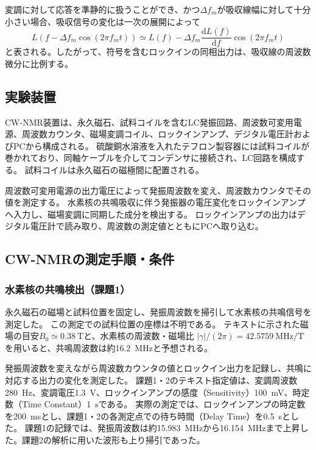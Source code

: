 \documentclass[dvipdfmx,a4paper,11pt]{jsarticle}
\begin{document}
変調に対して応答を準静的に扱うことができ、かつ$\Delta f_m$が吸収線幅に対して十分小さい場合、吸収信号の変化は一次の展開によって
\begin{equation}
 L\!\left(f-\Delta f_m\cos(2\pi f_m t)\right)
 \simeq L(f)-\Delta f_m\frac{\mathrm{d}L(f)}{\mathrm{d}f}\cos(2\pi f_m t)
\end{equation}
と表される。したがって、符号を含むロックインの同相出力は、吸収線の周波数微分に比例する。

\subsection{実験装置}
CW-NMR装置は、永久磁石、試料コイルを含むLC発振回路、周波数可変用電源、周波数カウンタ、磁場変調コイル、ロックインアンプ、デジタル電圧計およびPCから構成される\cite{manual}。
硫酸銅水溶液を入れたテフロン製容器には試料コイルが巻かれており、同軸ケーブルを介してコンデンサに接続され、LC回路を構成する。
試料コイルは永久磁石の磁極間に配置される。

周波数可変用電源の出力電圧によって発振周波数を変え、周波数カウンタでその値を測定する。
水素核の共鳴吸収に伴う発振器の電圧変化をロックインアンプへ入力し、磁場変調に同期した成分を検出する。
ロックインアンプの出力はデジタル電圧計で読み取り、周波数の測定値とともにPCへ取り込む。

\subsection{CW-NMRの測定手順・条件}
\label{sec:method-cw}
\subsubsection{水素核の共鳴検出（課題1）}
永久磁石の磁場と試料位置を固定し、発振周波数を掃引して水素核の共鳴信号を測定した。
この測定での試料位置の座標は不明である。
テキストに示された磁場の目安$B_0\simeq\SI{0.38}{\tesla}$と、水素核の周波数・磁場比
$|\gamma|/(2\pi)=\SI{42.5759}{\mega\hertz\per\tesla}$を用いると、共鳴周波数は約\SI{16.2}{\mega\hertz}と予想される。

発振周波数を変えながら周波数カウンタの値とロックイン出力を記録し、共鳴に対応する出力の変化を測定した。
課題1・2のテキスト指定値は、変調周波数\SI{280}{\hertz}、変調電圧\SI{1.3}{\volt}、ロックインアンプの感度（Sensitivity）\SI{100}{\milli\volt}、時定数（Time Constant）\SI{1}{\second}である\cite{manual}。
実際の測定では、ロックインアンプの時定数を\SI{200}{\milli\second}とし、課題1・2の各測定点での待ち時間（Delay Time）を\SI{0.5}{\second}とした。
課題1の記録では、発振周波数は約\SI{15.983}{\mega\hertz}から\SI{16.154}{\mega\hertz}まで上昇した。課題2の解析に用いた波形も上り掃引であった。
\end{document}
